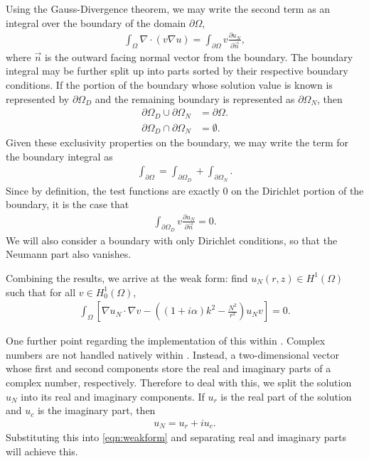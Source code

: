 Using the Gauss-Divergence theorem, we may write the second term as an integral over the boundary of the domain $\partial \Omega$,
\begin{align}
	\int_\Omega \nabla \cdot (v \nabla u ) = \int_{\partial\Omega} v \frac{\partial u_N}{\partial \vec{n}},
\end{align}
where $\vec{n}$ is the outward facing normal vector from the boundary.
The boundary integral may be further split up into parts sorted by their respective boundary conditions.
If the portion of the boundary whose solution value is known is represented by $\partial \Omega_D$ and the remaining boundary is represented as $\partial \Omega_N$, then
\begin{subequations}
\begin{align}
	\partial \Omega_D \cup \partial \Omega_N &= \partial \Omega. \\
	\partial \Omega_D \cap \partial \Omega_N &= \emptyset.
\end{align}
\end{subequations}
Given these exclusivity properties on the boundary, we may write the term for the boundary integral as
\begin{align}
	\int_{\partial\Omega} = \int_{\partial\Omega_D} + \int_{\partial\Omega_N}.
\end{align}
Since by definition, the test functions are exactly 0 on the Dirichlet portion of the boundary, it is the case that
\begin{align}
	\int_{\partial\Omega_D} v \frac{\partial u_N}{\partial \vec{n}} = 0.
\end{align}
We will also consider a boundary with only Dirichlet conditions, so that the Neumann part also vanishes.

Combining the results, we arrive at the weak form: find $u_N(r,z) \in H^1(\Omega)$ such that for all $v \in H^1_0(\Omega)$,
\begin{align}
	\int_\Omega \left[
		\nabla u_N \cdot \nabla v 
	  - \left((1+i\alpha)k^2 - \frac{N^2}{r^2}\right) u_N v 
	\right] = 0. \label{eqn:weakform}
\end{align}


One further point regarding the implementation of this within \oomph.
Complex numbers are not handled natively within \oomph.
Instead, a two-dimensional vector whose first and second components store the real and imaginary parts of a complex number, respectively.
Therefore to deal with this, we split the solution $u_N$ into its real and imaginary components.
If $u_r$ is the real part of the solution and $u_c$ is the imaginary part, then
\begin{align}
	u_N = u_r + i u_c.
\end{align}
Substituting this into \eqref{eqn:weakform} and separating real and imaginary parts will achieve this.







